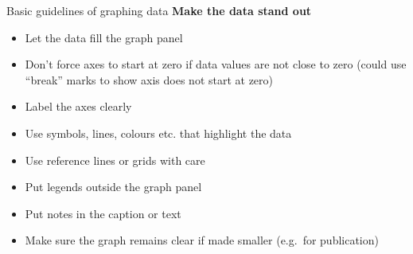 \documentclass[
  11pt,
  ignorenonframetext,
  twocolumn]{beamer}
\providecommand{\tightlist}{%
  \setlength{\itemsep}{0pt}\setlength{\parskip}{0pt}}
\begin{document}
\begin{frame}{Basic guidelines of graphing data}
\protect\hypertarget{basic-guidelines-of-graphing-data}{}
\textbf{Make the data stand out}

\begin{itemize}
\tightlist
\item
  Let the data fill the graph panel
\item
  Don't force axes to start at zero if data values are not close to zero
  (could use ``break'' marks to show axis does not start at zero)
\item
  Label the axes clearly
\item
  Use symbols, lines, colours etc. that highlight the data
\item
  Use reference lines or grids with care
\item
  Put legends outside the graph panel
\item
  Put notes in the caption or text
\item
  Make sure the graph remains clear if made smaller (e.g.~for
  publication)
\end{itemize}
\end{frame}
\end{document}
